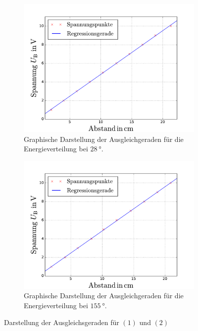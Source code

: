 \begin{figure}
  \centering
  \begin{subfigure}{0.48\textwidth}
    \centering
    \includegraphics[width=1 \textwidth]{../Messdaten/zim.pdf}
    \caption{Graphische Darstellung der Ausgleichgeraden für die Energieverteilung bei $\SI{28}{\degree}$.} %
    \label{fig: energie_zim}
  \end{subfigure}
  \begin{subfigure}{0.48\textwidth}
    \centering
    \includegraphics[width=1 \textwidth]{../Messdaten/spannungsfit_energieverteilung_150grad.pdf}
    \caption{Graphische Darstellung der Ausgleichgeraden für die Energieverteilung bei $\SI{155}{\degree}$.} %
    \label{fig: enrgie_hot}
  \end{subfigure}
  \caption{Darstellung der Ausgleichsgeraden für $(1)$ und $(2)$}
  \label{fig: darstellung_1}
\end{figure}
